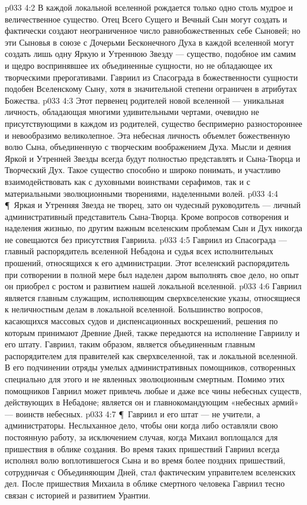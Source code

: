 \vs p033 4:2 В каждой локальной вселенной рождается только одно столь мудрое и величественное существо. Отец Всего Сущего и Вечный Сын могут создать и фактически создают неограниченное число равнобожественных себе Сыновей; но эти Сыновья в союзе с Дочерьми Бесконечного Духа в каждой вселенной могут создать лишь одну Яркую и Утреннюю Звезду --- существо, подобное им самим и щедро воспринявшее их объединенные сущности, но не обладающее их творческими прерогативами. Гавриил из Спасограда в божественности сущности подобен Вселенскому Сыну, хотя в значительной степени ограничен в атрибутах Божества.
\vs p033 4:3 Этот первенец родителей новой вселенной --- уникальная личность, обладающая многими удивительными чертами, очевидно не присутствующими в каждом из родителей, существо беспримерно разностороннее и невообразимо великолепное. Эта небесная личность объемлет божественную волю Сына, объединенную с творческим воображением Духа. Мысли и деяния Яркой и Утренней Звезды всегда будут полностью представлять и Сына\hyp{}Творца и Творческий Дух. Такое существо способно и широко понимать, и участливо взаимодействовать как с духовными воинствами серафимов, так и с материальными эволюционными творениями, наделенными волей.
\vs p033 4:4 \P\ Яркая и Утренняя Звезда не творец, зато он чудесный руководитель --- личный административный представитель Сына\hyp{}Творца. Кроме вопросов сотворения и наделения жизнью, по другим важным вселенским проблемам Сын и Дух никогда не совещаются без присутствия Гавриила.
\vs p033 4:5 Гавриил из Спасограда --- главный распорядитель вселенной Небадона и судья всех исполнительных прошений, относящихся к его администрации. Этот вселенский распорядитель при сотворении в полной мере был наделен даром выполнять свое дело, но опыт он приобрел с ростом и развитием нашей локальной вселенной.
\vs p033 4:6 Гавриил является главным служащим, исполняющим сверхвселенские указы, относящиеся к неличностным делам в локальной вселенной. Большинство вопросов, касающихся массовых судов и диспенсационных воскрешений, решения по которым принимают Древние Дней, также передаются на исполнение Гавриилу и его штату. Гавриил, таким образом, является объединенным главным распорядителем для правителей как сверхвселенной, так и локальной вселенной. В его подчинении отряды умелых административных помощников, сотворенных специально для этого и не явленных эволюционным смертным. Помимо этих помощников Гавриил может привлечь любые и даже все чины небесных существ, действующих в Небадоне; является он и главнокомандующим «небесных армий» --- воинств небесных.
\vs p033 4:7 \P\ Гавриил и его штат --- не учители, а администраторы. Неслыханное дело, чтобы они когда либо оставляли свою постоянную работу, за исключением случая, когда Михаил воплощался для пришествия в облике создания. Во время таких пришествий Гавриил всегда исполнял волю воплотившегося Сына и во время более поздних пришествий, сотрудничая с Объединяющим Дней, стал фактическим управителем вселенских дел. После пришествия Михаила в облике смертного человека Гавриил тесно связан с историей и развитием Урантии.
